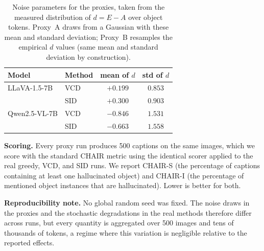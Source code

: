 \begin{table}[t]
\centering
\small
\caption{Noise parameters for the proxies, taken from the measured distribution
of $d = E - A$ over object tokens. Proxy~A draws from a Gaussian with these mean
and standard deviation; Proxy~B resamples the empirical $d$ values (same mean and
standard deviation by construction).}
\label{tab:dproxy-noise}
\begin{tabular}{llcc}
\toprule
Model & Method & mean of $d$ & std of $d$ \\
\midrule
LLaVA-1.5-7B & VCD & $+0.199$ & $0.853$ \\
 & SID & $+0.300$ & $0.903$ \\
Qwen2.5-VL-7B & VCD & $-0.846$ & $1.531$ \\
 & SID & $-0.663$ & $1.558$ \\
\bottomrule
\end{tabular}
\end{table}

\textbf{Scoring.} Every proxy run produces 500 captions on the same images, which
we score with the standard CHAIR metric using the identical scorer applied to the
real greedy, VCD, and SID runs. We report CHAIR-S (the percentage of captions
containing at least one hallucinated object) and CHAIR-I (the percentage of
mentioned object instances that are hallucinated). Lower is better for both.

\textbf{Reproducibility note.} No global random seed was fixed. The noise draws
in the proxies and the stochastic degradations in the real methods therefore
differ across runs, but every quantity is aggregated over 500 images and tens of
thousands of tokens, a regime where this variation is negligible relative to the
reported effects.
